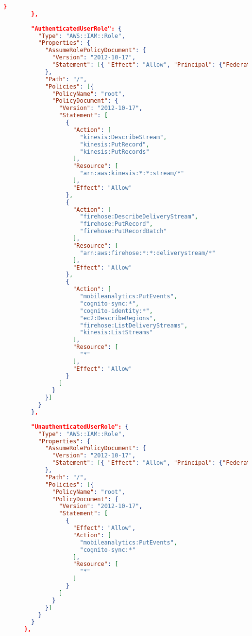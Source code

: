 \begin{lstlisting}[language=json,firstnumber=1]
          }
        },
        
        "AuthenticatedUserRole": {
          "Type": "AWS::IAM::Role",
          "Properties": {
            "AssumeRolePolicyDocument": {
              "Version": "2012-10-17",
              "Statement": [{ "Effect": "Allow", "Principal": {"Federated": ["cognito-identity.amazonaws.com"]}, "Action": ["sts:AssumeRoleWithWebIdentity"] }]
            },
            "Path": "/",
            "Policies": [{
              "PolicyName": "root",
              "PolicyDocument": {
                "Version": "2012-10-17",
                "Statement": [
                  {
                    "Action": [
                      "kinesis:DescribeStream",
                      "kinesis:PutRecord",
                      "kinesis:PutRecords"
                    ],
                    "Resource": [
                      "arn:aws:kinesis:*:*:stream/*"
                    ],
                    "Effect": "Allow"
                  },
                  {
                    "Action": [
                      "firehose:DescribeDeliveryStream",
                      "firehose:PutRecord",
                      "firehose:PutRecordBatch"
                    ],
                    "Resource": [
                      "arn:aws:firehose:*:*:deliverystream/*"
                    ],
                    "Effect": "Allow"
                  },
                  {
                    "Action": [
                      "mobileanalytics:PutEvents",
                      "cognito-sync:*",
                      "cognito-identity:*",
                      "ec2:DescribeRegions",
                      "firehose:ListDeliveryStreams",
                      "kinesis:ListStreams"
                    ],
                    "Resource": [
                      "*"
                    ],
                    "Effect": "Allow"
                  }
                ]
              }
            }]
          }
        },
        
        "UnauthenticatedUserRole": {
          "Type": "AWS::IAM::Role",
          "Properties": {
            "AssumeRolePolicyDocument": {
              "Version": "2012-10-17",
              "Statement": [{ "Effect": "Allow", "Principal": {"Federated": ["cognito-identity.amazonaws.com"]}, "Action": ["sts:AssumeRoleWithWebIdentity"] }]
            },
            "Path": "/",
            "Policies": [{
              "PolicyName": "root",
              "PolicyDocument": {
                "Version": "2012-10-17",
                "Statement": [
                  {
                    "Effect": "Allow",
                    "Action": [
                      "mobileanalytics:PutEvents",
                      "cognito-sync:*"
                    ],
                    "Resource": [
                      "*"
                    ]
                  }
                ]
              }
            }]
          }
        }
      },
      

\end{lstlisting}
